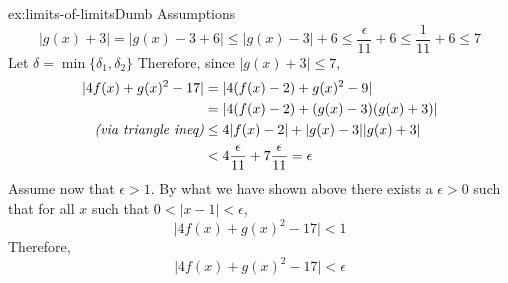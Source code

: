 \documentclass[landscape, 8pt]{extarticle}
\begin{document}
\begin{multicols}{3}
\begin{xmp}{ex:limits-of-limits}{Dumb Assumptions}
    \[\lvert g(x) + 3\rvert = \lvert g(x) - 3 + 6\rvert \le \lvert g(x) - 3\rvert + 6 \le \frac{\epsilon}{11} + 6 \le \frac{1}{11} + 6 \le 7\]
    Let $\delta = \min\{\delta_{1}, \delta_{2}\}$ Therefore, since $\lvert g(x) + 3\rvert  \le 7,$
    \[\begin{aligned}
        \lvert 4f(x)+g(x)^{2} - 17 \rvert &= \lvert 4(f(x)-2) + g(x)^{2}-9\rvert \\
        &= \lvert 4(f(x)-2) + (g(x)-3)(g(x)+3)\rvert \\
        \text{\textit{(via triangle ineq)}} &\le 4\lvert f(x)-2\rvert + \lvert g(x)-3\rvert \lvert g(x)+3\rvert \\
        &< 4\frac{\epsilon}{11} + 7 \frac{\epsilon}{11}
        = \epsilon
    \end{aligned}\]
    Assume now that $\epsilon > 1$. By what we have shown above there exists a $\epsilon>0$ such that for all $x$ such that $0<\lvert x-1\rvert <\epsilon$,
    \[\lvert 4f(x) + g(x)^{2} - 17  \rvert < 1\]
    Therefore,
    \[\lvert 4f(x) + g(x)^{2} - 17  \rvert < \epsilon\]
\end{xmp}
\vspace{-5pt}



\end{multicols}
\end{document}
